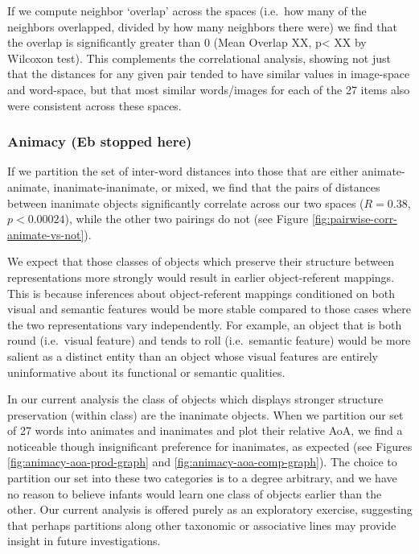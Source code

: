 \documentclass[10pt, letterpaper]{article}
\begin{document}
If we compute neighbor `overlap' across the spaces (i.e.~how many of the
neighbors overlapped, divided by how many neighbors there were) we find
that the overlap is significantly greater than 0 (Mean Overlap XX,
p\textless{} XX by Wilcoxon test). This complements the correlational
analysis, showing not just that the distances for any given pair tended
to have similar values in image-space and word-space, but that most
similar words/images for each of the 27 items also were consistent
across these spaces.

\subsubsection{Animacy (Eb stopped here)}\label{animacy-eb-stopped-here}

If we partition the set of inter-word distances into those that are
either animate-animate, inanimate-inanimate, or mixed, we find that the
pairs of distances between inanimate objects significantly correlate
across our two spaces (\(R = 0.38\), \(p < 0.00024\)), while the other
two pairings do not (see Figure \ref{fig:pairwise-corr-animate-vs-not}).

We expect that those classes of objects which preserve their structure
between representations more strongly would result in earlier
object-referent mappings. This is because inferences about
object-referent mappings conditioned on both visual and semantic
features would be more stable compared to those cases where the two
representations vary independently. For example, an object that is both
round (i.e.~visual feature) and tends to roll (i.e.~semantic feature)
would be more salient as a distinct entity than an object whose visual
features are entirely uninformative about its functional or semantic
qualities.

In our current analysis the class of objects which displays stronger
structure preservation (within class) are the inanimate objects. When we
partition our set of 27 words into animates and inanimates and plot
their relative AoA, we find a noticeable though insignificant preference
for inanimates, as expected (see Figures
\ref{fig:animacy-aoa-prod-graph} and \ref{fig:animacy-aoa-comp-graph}).
The choice to partition our set into these two categories is to a degree
arbitrary, and we have no reason to believe infants would learn one
class of objects earlier than the other. Our current analysis is offered
purely as an exploratory exercise, suggesting that perhaps partitions
along other taxonomic or associative lines may provide insight in future
investigations.
\end{document}
